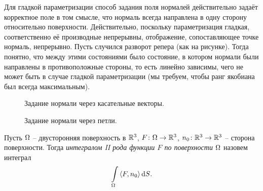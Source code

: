 \begin{remark}
    Для гладкой параметризации способ задания поля нормалей действительно задаёт корректное
    поле в том смысле, что нормаль всегда направлена в одну сторону относительно поверхности.
    Действительно, поскольку параметризация гладкая, соответственно её производные непрерывны,
    отображение, сопоставляющее точке нормаль, непрерывно. Пусть случился разворот репера (как
    на рисунке). Тогда понятно, что между этими состояниями было состояние, в котором
    нормали были направлены в противоположные стороны, то есть линейно зависимы, чего не может
    быть в случае гладкой параметризации (мы требуем, чтобы ранг якобиана был всегда максимальным).
\end{remark}

\begin{figure}[ht]
    \centering
    \caption{Задание нормали через касательные векторы.}
\end{figure}

\begin{figure}[ht]
    \centering
    \caption{Задание нормали через петли.}
\end{figure}

\begin{definition}
    Пусть $\Omega$ -- двусторонняя поверхность в $\mathbb{R}^3$, $F \colon \Omega \to \mathbb{R}^3$, 
    $n_0 \colon \mathbb{R}^3 \to \mathbb{R}^3$ -- сторона поверхности. Тогда \textit{
    интегралом II рода функции $F$ по поверхности $\Omega$} назовем интеграл
\[
    \int\limits_{\Omega}{\langle F, n_0 \rangle \,\mathrm{d} S}
.\] 
\end{definition}

